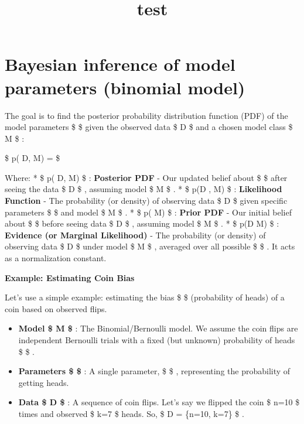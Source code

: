 \documentclass[11pt]{article}
\title{test}
\providecommand{\tightlist}{%
      \setlength{\itemsep}{0pt}\setlength{\parskip}{0pt}}
\begin{document}
    
    \maketitle
    
    

    
    \section{Bayesian inference of model parameters (binomial
model)}\label{bayesian-inference-of-model-parameters-binomial-model}

The goal is to find the posterior probability distribution function
(PDF) of the model parameters \$ \theta \$ given the observed data \$ D
\$ and a chosen model class \$ M \$ :

\$ p(\theta \textbar{} D, M) =
 \$

Where: * \$ p(\theta \textbar{} D, M) \$ : \textbf{Posterior PDF} - Our
updated belief about \$ \theta \$ after seeing the data \$ D \$ ,
assuming model \$ M \$ . * \$ p(D \textbar{} \theta, M) \$ :
\textbf{Likelihood Function} - The probability (or density) of observing
data \$ D \$ given specific parameters \$ \theta \$ and model \$ M \$ .
* \$ p(\theta \textbar{} M) \$ : \textbf{Prior PDF} - Our initial belief
about \$ \theta \$ before seeing data \$ D \$ , assuming model \$ M \$ .
* \$ p(D \textbar{} M) \$ : \textbf{Evidence (or Marginal Likelihood)} -
The probability (or density) of observing data \$ D \$ under model \$ M
\$ , averaged over all possible \$ \theta \$ . It acts as a
normalization constant.

\textbf{Example: Estimating Coin Bias}

Let's use a simple example: estimating the bias \$ \theta \$
(probability of heads) of a coin based on observed flips.

\begin{itemize}
\tightlist
\item
  \textbf{Model \$ M \$ }: The Binomial/Bernoulli model. We assume the
  coin flips are independent Bernoulli trials with a fixed (but unknown)
  probability of heads \$ \theta \$ .
\item
  \textbf{Parameters \$ \theta \$ }: A single parameter, \$
  \theta \in [0, 1] \$ , representing the probability of getting heads.
\item
  \textbf{Data \$ D \$ }: A sequence of coin flips. Let's say we flipped
  the coin \$ n=10 \$ times and observed \$ k=7 \$ heads. So, \$ D =
  \{n=10, k=7\} \$ .
\end{itemize}
\end{document}
